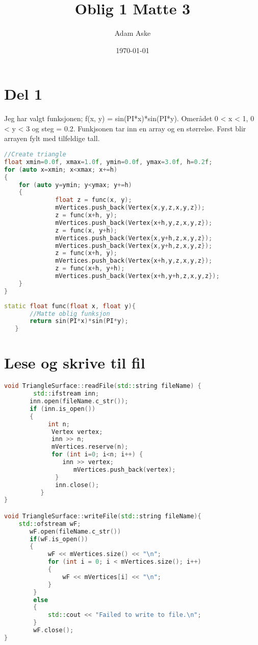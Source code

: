 \documentclass[a4paper,norsk]{article}
\title{Oblig 1 Matte 3}
\date{\today}
\author{Adam Aske}
\begin{document}
\maketitle
\tableofcontents
\newpage

\section{Del 1}
Jeg har valgt funksjonen; f(x, y) = sin(PI*x)*sin(PI*y). Omerådet 0 < x < 1, 0 < y < 3 og steg = 0.2.
Funkjsonen tar inn en array og en størrelse. Først blir arrayen fylt med tilfeldige tall. 
\begin{lstlisting}[language=C++, caption={trianglesurface.cpp}]
//Create triangle
float xmin=0.0f, xmax=1.0f, ymin=0.0f, ymax=3.0f, h=0.2f;
for (auto x=xmin; x<xmax; x+=h)
{
	for (auto y=ymin; y<ymax; y+=h)
	{
              float z = func(x, y);
              mVertices.push_back(Vertex{x,y,z,x,y,z});
              z = func(x+h, y);
              mVertices.push_back(Vertex{x+h,y,z,x,y,z});
              z = func(x, y+h);
              mVertices.push_back(Vertex{x,y+h,z,x,y,z});
              mVertices.push_back(Vertex{x,y+h,z,x,y,z});
              z = func(x+h, y);
              mVertices.push_back(Vertex{x+h,y,z,x,y,z});
              z = func(x+h, y+h);
              mVertices.push_back(Vertex{x+h,y+h,z,x,y,z});
	}
}
\end{lstlisting}
\begin{lstlisting}[language=C++, caption={trianglesurface.hh}]
static float func(float x, float y){
       //Matte oblig funksjon
       return sin(PI*x)*sin(PI*y);
   }
\end{lstlisting}
\section{Lese og skrive til fil}
\begin{lstlisting}[language=C++, caption={trianglesurface.cpp}]
void TriangleSurface::readFile(std::string fileName) {
    	std::ifstream inn;
       inn.open(fileName.c_str());
       if (inn.is_open())
       {
        	int n;
             Vertex vertex;
             inn >> n;
             mVertices.reserve(n);
             for (int i=0; i<n; i++) {
             	inn >> vertex;
                   mVertices.push_back(vertex);
              }
              inn.close();
          }
}

void TriangleSurface::writeFile(std::string fileName){
	std::ofstream wF;
       wF.open(fileName.c_str())
       if(wF.is_open())
       {
        	wF << mVertices.size() << "\n";
            for (int i = 0; i < mVertices.size(); i++)
            {
                wF << mVertices[i] << "\n";
            }
        }
        else
        {
            std::cout << "Failed to write to file.\n";
        }
        wF.close();
}
\end{lstlisting}
\end{document}
